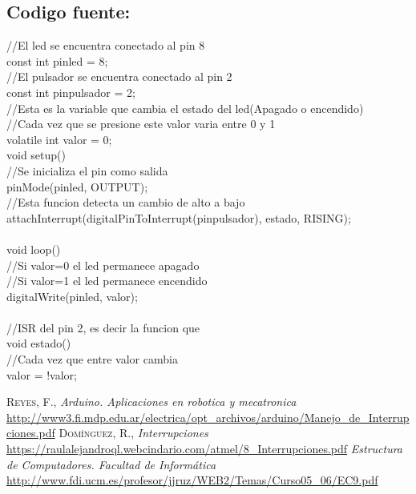 \documentclass[11pt,letterpaper]{article}
\begin{document}
\subsection*{Codigo fuente:}
//El led se encuentra conectado al pin 8\\
const int pinled = 8;\\
//El pulsador se encuentra conectado al pin 2\\
const int pinpulsador = 2;\\
//Esta es la variable que cambia el estado del led(Apagado o encendido)\\
//Cada vez que se presione este valor varia entre 0 y 1\\
volatile int valor = 0;\\
void setup() {\\
  //Se inicializa el pin como salida\\
   pinMode(pinled, OUTPUT);\\
  //Esta funcion detecta un cambio de alto a bajo\\
   attachInterrupt(digitalPinToInterrupt(pinpulsador), estado, RISING);\\
}\\
void loop() {\\
   //Si valor=0 el led permanece apagado\\
  //Si valor=1 el led permanece encendido\\
   digitalWrite(pinled, valor);\\
}\\
//ISR del pin 2, es decir la funcion que\\
void estado() {\\
  //Cada vez que entre valor cambia\\
   valor = !valor;\\
}


\begin{thebibliography}{a}
 \textsc{Reyes, F.},
\textit{Arduino. Aplicaciones en robotica y mecatronica}
\url{http://www3.fi.mdp.edu.ar/electrica/opt_archivos/arduino/Manejo_de_Interrupciones.pdf}
 \textsc{Domínguez, R.},
\textit{Interrupciones}
\url{https://raulalejandroql.webcindario.com/atmel/8_Interrupciones.pdf}
\textit{Estructura de Computadores. Facultad de Informática}
\url{http://www.fdi.ucm.es/profesor/jjruz/WEB2/Temas/Curso05_06/EC9.pdf}
\end{thebibliography}
\end{document}
